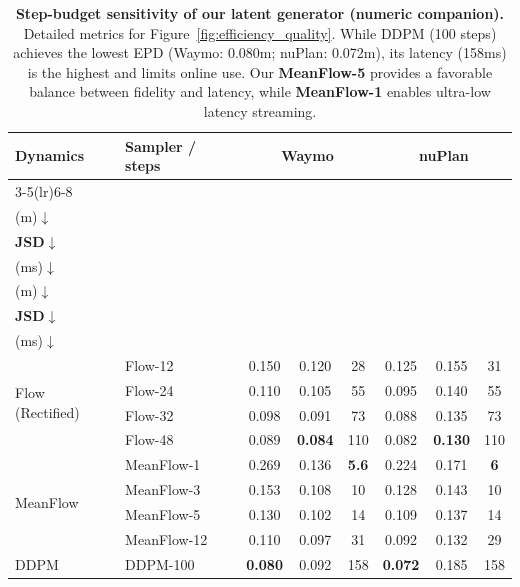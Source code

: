 \documentclass{article}
\newcommand{\best}[1]{\textbf{#1}}
\theoremstyle{plain}
\theoremstyle{definition}
\theoremstyle{remark}
\begin{document}
\begin{table}[ht]
\centering
\small
\caption{\textbf{Step-budget sensitivity of our latent generator (numeric companion).}
Detailed metrics for Figure~\ref{fig:efficiency_quality}.
While DDPM (100 steps) achieves the lowest EPD (Waymo: 0.080m; nuPlan: 0.072m), its latency (158ms) is the highest and limits online use.
Our \textbf{MeanFlow-5} provides a favorable balance between fidelity and latency, while \textbf{MeanFlow-1} enables ultra-low latency streaming.}
\label{tab:app-step-budget-sensitivity-redesign}
\setlength{\tabcolsep}{3.8pt}
\renewcommand{\arraystretch}{1.0}
\begin{threeparttable}
\begin{tabular}{@{}l l ccc ccc@{}}
\toprule
\multirow{3.5}{*}{\textbf{Dynamics}}
& \multirow{3.5}{*}{\textbf{Sampler / steps}}
& \multicolumn{3}{c}{\textbf{Waymo}}
& \multicolumn{3}{c}{\textbf{nuPlan}} \\
\cmidrule(lr){3-5}\cmidrule(lr){6-8}
& &
\makecell{\textbf{EPD}\\(m)\(\downarrow\)}
& \makecell{\textbf{Agent}\\\textbf{JSD}\(\downarrow\)}
& \makecell{\textbf{Time}\\(ms)\(\downarrow\)}
&
\makecell{\textbf{EPD}\\(m)\(\downarrow\)}
& \makecell{\textbf{Agent}\\\textbf{JSD}\(\downarrow\)}
& \makecell{\textbf{Time}\\(ms)\(\downarrow\)} \\
\midrule

\multirow{4}{*}{Flow (Rectified)}
& Flow-12 & 0.150 & 0.120 & 28  & 0.125 & 0.155 & 31  \\
& Flow-24 & 0.110 & 0.105 & 55  & 0.095 & 0.140 & 55  \\
& Flow-32 & 0.098 & 0.091 & 73  & 0.088 & 0.135 & 73  \\
& Flow-48 & 0.089 & \best{0.084} & 110 & 0.082 & \best{0.130} & 110 \\
\midrule

\multirow{4}{*}{MeanFlow}
& MeanFlow-1  & 0.269 & 0.136 & \best{5.6} & 0.224 & 0.171 & \best{6} \\
& MeanFlow-3  & 0.153 & 0.108 & 10         & 0.128 & 0.143 & 10        \\
& MeanFlow-5  & 0.130 & 0.102 & 14         & 0.109 & 0.137 & 14        \\
& MeanFlow-12 & 0.110 & 0.097 & 31         & 0.092 & 0.132 & 29        \\
\midrule

\multirow{1}{*}{DDPM}
& DDPM-100 & \best{0.080} & 0.092 & 158 & \best{0.072} & 0.185 & 158 \\
\bottomrule
\end{tabular}
\end{threeparttable}
\end{table}
\end{document}

